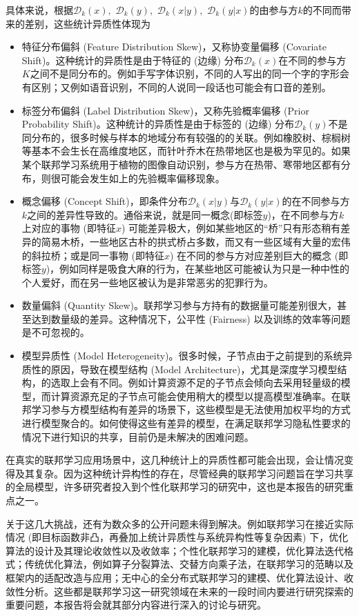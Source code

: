 \begin{itemize}
具体来说，根据$\mathcal{D}_k(x),$ $\mathcal{D}_k(y),$ $\mathcal{D}_k(x | y),$ $\mathcal{D}_k(y | x)$的由参与方$k$的不同而带来的差别，这些统计异质性体现为
\begin{itemize}
    \item 特征分布偏斜 (Feature Distribution Skew)，又称协变量偏移 (Covariate Shift)。这种统计的异质性是由于特征的 (边缘) 分布$\mathcal{D}_k(x)$在不同的参与方$K$之间不是同分布的。例如手写字体识别，不同的人写出的同一个字的字形会有区别；又例如语音识别，不同的人说同一段话也可能会有口音的差别。
    \item 标签分布偏斜 (Label Distribution Skew)，又称先验概率偏移 (Prior Probability Shift)。这种统计的异质性是由于标签的 (边缘) 分布$\mathcal{D}_k(y)$不是同分布的，很多时候与样本的地域分布有较强的的关联。例如橡胶树、棕榈树等基本不会生长在高维度地区，而针叶乔木在热带地区也是极为罕见的。如果某个联邦学习系统用于植物的图像自动识别，参与方在热带、寒带地区都有分布，则很可能会发生如上的先验概率偏移现象。
    \item 概念偏移 (Concept Shift)，即条件分布$\mathcal{D}_k(x | y)$与$\mathcal{D}_k(y | x)$的在不同参与方$k$之间的差异性导致的。通俗来说，就是同一概念(即标签$y$)，在不同参与方$k$上对应的事物 (即特征$x$) 可能差异极大，例如某些地区的``桥''只有形态稍有差异的简易木桥，一些地区古朴的拱式桥占多数，而又有一些区域有大量的宏伟的斜拉桥；或是同一事物 (即特征$x$) 在不同的参与方对应差别巨大的概念 (即标签$y$)，例如同样是吸食大麻的行为，在某些地区可能被认为只是一种中性的个人爱好，而在另一些地区被认为是非常恶劣的犯罪行为。
    \item 数量偏斜 (Quantity Skew)。联邦学习参与方持有的数据量可能差别很大，甚至达到数量级的差异。这种情况下，公平性 (Fairness) 以及训练的效率等问题是不可忽视的。
\item 模型异质性 (Model Heterogeneity)。很多时候，子节点由于之前提到的系统异质性的原因，导致在模型结构 (Model Architecture)，尤其是深度学习模型结构，的选取上会有不同。例如计算资源不足的子节点会倾向去采用轻量级的模型，而计算资源充足的子节点可能会使用稍大的模型以提高模型准确率。在联邦学习参与方模型结构有差异的场景下，这些模型是无法使用加权平均\cite{mcmahan2017fed_avg}的方式进行模型聚合的。如何使得这些有差异的模型，在满足联邦学习隐私性要求的情况下进行知识的共享，目前仍是未解决的困难问题。
\end{itemize}
在真实的联邦学习应用场景中，这几种统计上的异质性都可能会出现，会让情况变得及其复杂。因为这种统计异构性的存在，尽管经典的联邦学习问题旨在学习共享的全局模型，许多研究者投入到个性化联邦学习的研究中，这也是本报告的研究重点之一。
\end{itemize}

关于这几大挑战，还有为数众多的公开问题未得到解决。例如联邦学习在接近实际情况 (即目标函数非凸，再叠加上统计异质性与系统异构性等复杂因素) 下，优化算法的设计及其理论收敛性以及收敛率；个性化联邦学习的建模，优化算法迭代格式；传统优化算法，例如算子分裂算法、交替方向乘子法，在联邦学习的范畴以及框架内的适配改造与应用；无中心的全分布式联邦学习的建模、优化算法设计、收敛性分析。这些都是联邦学习这一研究领域在未来的一段时间内要进行研究探索的重要问题，本报告将会就其部分内容进行深入的讨论与研究。

